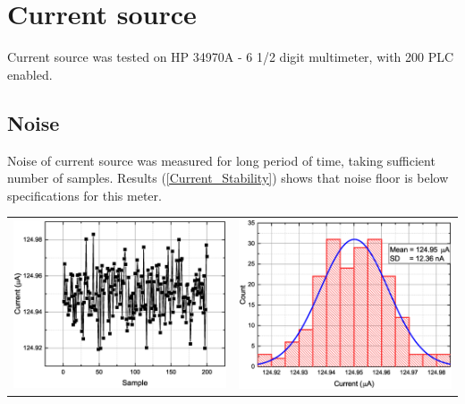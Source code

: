 \section{Current source}
    Current source was tested on HP 34970A - 6 1/2 digit multimeter, with 200 PLC enabled.

    \subsection{Noise}
        Noise of current source was measured for long period of time, taking sufficient number of samples. Results (\ref{Current_Stability}) shows that noise floor is below specifications for this meter.

        \begin{table}[H]
            \begin{center}
                \begin{tabular}{cc}
                    \includegraphics[width=0.35\paperwidth]{img/07/current_time.eps}
                    &
                    \includegraphics[width=0.35\paperwidth]{img/07/current_hist.eps}

\end{tabular}
\end{center}
\end{table}
